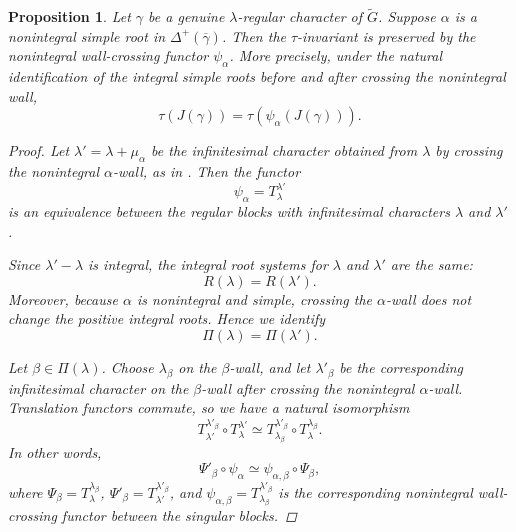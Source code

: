 \documentclass{amsart}
\newtheorem{prop}[thm]{Proposition}
\theoremstyle{definition}
\begin{document}
\begin{prop}\label{p:transtau}
Let $\gamma$ be a genuine $\lambda$-regular character of $\widetilde G$. Suppose $\alpha$ is a nonintegral simple root in $\Delta^+(\overline\gamma)$. Then the $\tau$-invariant is preserved by the nonintegral wall-crossing functor $\psi_\alpha$. More precisely, under the natural identification of the integral simple roots before and after crossing the nonintegral wall,
\begin{equation*}
\tau(J(\gamma))
=
\tau(\psi_\alpha(J(\gamma))).
\end{equation*}


\begin{proof}
Let $\lambda'=\lambda+\mu_\alpha$ be the infinitesimal character obtained from $\lambda$ by crossing the nonintegral $\alpha$-wall, as in \cite[Proposition 7.3.3]{V81}. Then the functor
\begin{equation*}
\psi_\alpha=T_\lambda^{\lambda'}
\end{equation*}
is an equivalence between the regular blocks with infinitesimal characters $\lambda$ and $\lambda'$.

Since $\lambda'-\lambda$ is integral, the integral root systems for $\lambda$ and $\lambda'$ are the same:
\begin{equation*}
R(\lambda)=R(\lambda').
\end{equation*}
Moreover, because $\alpha$ is nonintegral and simple, crossing the $\alpha$-wall does not change the positive integral roots. Hence we identify
\begin{equation*}
\Pi(\lambda)=\Pi(\lambda').
\end{equation*}

Let $\beta\in\Pi(\lambda)$. Choose $\lambda_\beta$ on the $\beta$-wall, and let $\lambda'_\beta$ be the corresponding infinitesimal character on the $\beta$-wall after crossing the nonintegral $\alpha$-wall. Translation functors commute, so we have a natural isomorphism
\begin{equation*}
T_{\lambda'}^{\lambda'_\beta}\circ T_\lambda^{\lambda'}
\simeq
T_{\lambda_\beta}^{\lambda'_\beta}\circ T_\lambda^{\lambda_\beta}.
\end{equation*}
In other words,
\begin{equation*}
\Psi'_\beta\circ \psi_\alpha
\simeq
\psi_{\alpha,\beta}\circ \Psi_\beta,
\end{equation*}
where $\Psi_\beta=T_\lambda^{\lambda_\beta}$, $\Psi'_\beta=T_{\lambda'}^{\lambda'_\beta}$, and $\psi_{\alpha,\beta}=T_{\lambda_\beta}^{\lambda'_\beta}$ is the corresponding nonintegral wall-crossing functor between the singular blocks.


\end{proof}
\end{prop}
\end{document}
